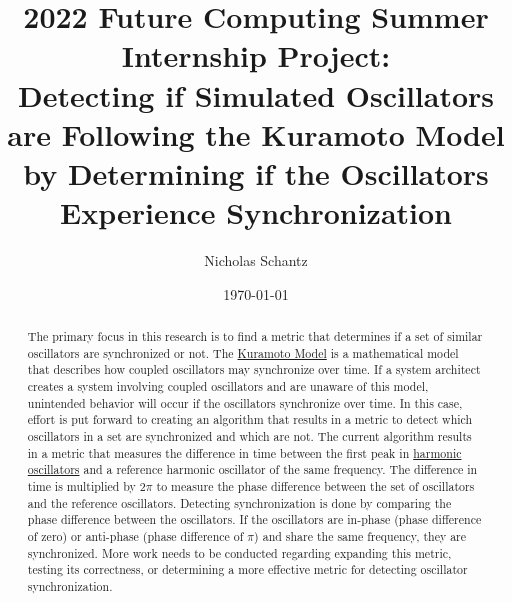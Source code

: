 \documentclass{article}
\begin{document}
    \begin{minipage}[h]{\textwidth}
        \title{2022 Future Computing Summer Internship Project:\\Detecting if Simulated Oscillators are Following the Kuramoto Model by Determining if the Oscillators Experience Synchronization}
        \author{Nicholas Schantz}
        \date{\today}
            \maketitle
        \begin{abstract}
        	The primary focus in this research is to find a metric that determines if a set of similar oscillators are synchronized or not. The \href{https://en.wikipedia.org/wiki/Kuramoto_model}{Kuramoto Model} is a mathematical model that describes how coupled oscillators may synchronize over time. If a system architect creates a system involving coupled oscillators and are unaware of this model, unintended behavior will occur if the oscillators synchronize over time. In this case, effort is put forward to creating an algorithm that results in a metric to detect which oscillators in a set are synchronized and which are not. The current algorithm results in a metric that measures the difference in time between the first peak in \href{https://en.wikipedia.org/wiki/Electronic_oscillator#Harmonic_oscillators}{harmonic oscillators} and a reference harmonic oscillator of the same frequency. The difference in time is multiplied by 2$\pi$ to measure the phase difference between the set of oscillators and the reference oscillators. Detecting synchronization is done by comparing the phase difference between the oscillators. If the oscillators are in-phase (phase difference of zero) or anti-phase (phase difference of $\pi$) and share the same frequency, they are synchronized. More work needs to be conducted regarding expanding this metric, testing its correctness, or determining a more effective metric for detecting oscillator synchronization.

        \end{abstract}
    \end{minipage}

\ \\


\end{document}
